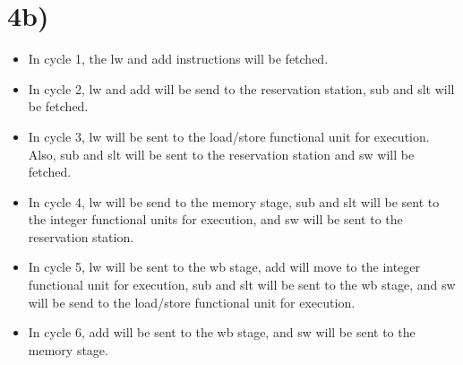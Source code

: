 \documentclass[a4paper,11pt]{article}
\begin{document}
\section*{4b)}
\begin{itemize}
  \item In cycle 1, the lw and add instructions will be fetched.  
  \item In cycle 2, lw and add 
will be send to the reservation station, sub and slt will be fetched.  
  \item In cycle 3, lw will be sent to the load/store functional unit for execution.  
Also, sub and slt will be sent to the reservation station and sw will be fetched.
  \item In cycle 4, lw will be send to the memory stage, sub and slt will be sent to the
integer functional units for execution, and sw will be sent to the reservation
station.  
  \item In cycle 5, lw will be sent to the wb stage, add will move to the 
integer functional unit for execution, sub and slt will be sent to the wb stage, and sw will be send to the load/store functional unit for execution.
  \item In cycle 6, add will be sent to the wb stage, and sw will be sent to the memory
stage.
\end{itemize}

\end{document}
